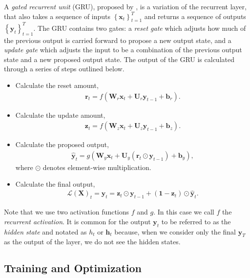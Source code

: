 \documentclass{somasmsc}
\begin{document}
A \textit{gated recurrent unit} (GRU), proposed by \citet{DBLP:journals/corr/ChoMGBSB14}, is a variation of the recurrent layer, that also takes a sequence of inputs $\left\{\pmb{x}_t\right\}_{t=1}^T$ and returns a sequence of outputs $\left\{\pmb{y}_t\right\}_{t=1}^T$. The GRU contains two gates: a \textit{reset gate} which adjusts how much of the previous output is carried forward to propose a new output state, and a \textit{update gate} which adjusts the input to be a combination of the previous output state and a new proposed output state. The output of the GRU is calculated through a series of steps outlined below.

\begin{itemize}
    \item Calculate the reset amount,
    \begin{align*}
    \pmb{r}_t = f(\mathbf{W}_r \pmb{x}_t + \mathbf{U}_r \pmb{y}_{t-1} + \pmb{b}_r).
    \end{align*}
    \item Calculate the update amount,
    \begin{align*}
    \pmb{z}_t = f(\mathbf{W}_z \pmb{x}_t + \mathbf{U}_z \pmb{y}_{t-1} + \pmb{b}_z).
    \end{align*}
    \item Calculate the proposed output,
    \begin{align*}
    \hat{\pmb{y}}_t = g(\mathbf{W}_y \pmb{x}_t + \mathbf{U}_y \left(\pmb{r}_t \odot \pmb{y}_{t-1}\right) + \pmb{b}_y),
    \end{align*}
    where $\odot$ denotes element-wise  multiplication.
    \item Calculate the final output,
    \begin{align*}
    \mathcal{L}\left(\mathbf{X}\right)_t = \pmb{y}_t = \pmb{z}_t \odot \pmb{y}_{t-1} + \left(\mathbf{1} - \pmb{z}_t\right) \odot \hat{\pmb{y}}_t.
    \end{align*}
\end{itemize}
Note that we use two activation functions $f$ and $g$. In this case we call $f$ the \textit{recurrent activation}. It is common for the output $\pmb{y}_t$ to be referred to as the \textit{hidden state} and notated as $h_t$ or $\pmb{h}_t$ because, when we consider only the final $\pmb{y}_T$ as the output of the layer, we do not see the hidden states.

\subsection{Training and Optimization}\label{intro:train}
\end{document}
